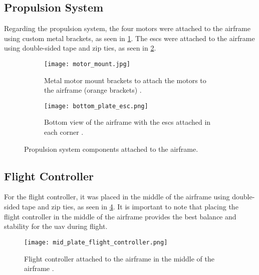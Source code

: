 \subsection{Propulsion System}\label{subsec:implementation_propulsion_system}

Regarding the propulsion system, the four motors were attached to the airframe using custom metal brackets, as seen in \cref{fig:motors_attached_to_airframe}. The \glspl{esc} were attached to the airframe using double-sided tape and zip ties, as seen in \cref{fig:esc_attached_to_airframe}.

\begin{figure}
  \hfill
  \begin{subfigure}{0.4\textwidth}
    \texttt{[image: motor\_mount.jpg]}
    \caption{Metal motor mount brackets to attach the motors to the airframe (orange brackets) \autocite{developingcosteffectivedrones5g}.}\label{fig:motors_attached_to_airframe}
  \end{subfigure}
  \hfill
  \begin{subfigure}{0.4\textwidth}
    \texttt{[image: bottom\_plate\_esc.png]}
    \caption{Bottom view of the airframe with the \glspl{esc} attached in each corner \autocite{developingcosteffectivedrones5g}.}\label{fig:esc_attached_to_airframe}
  \end{subfigure}
  \hfill

  \caption{Propulsion system components attached to the airframe.}\label{fig:propulsion_system_components_attached_to_airframe}
\end{figure}

\subsection{Flight Controller}\label{subsec:implementation_flight_controller}

For the flight controller, it was placed in the middle of the airframe using double-sided tape and zip ties, as seen in \cref{fig:flight_controller_attached_to_airframe}. It is important to note that placing the flight controller in the middle of the airframe provides the best balance and stability for the \gls{uav} during flight.

\begin{figure}
  \texttt{[image: mid\_plate\_flight\_controller.png]}
  \caption{Flight controller attached to the airframe in the middle of the airframe \autocite{developingcosteffectivedrones5g}.}\label{fig:flight_controller_attached_to_airframe}
\end{figure}

